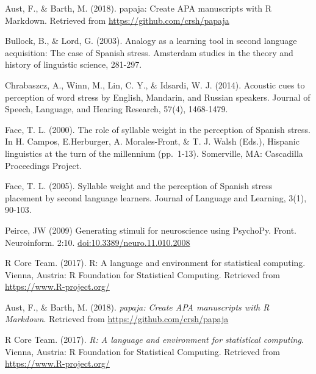 \documentclass[man]{apa6}
\theoremstyle{definition}
\theoremstyle{definition}
\theoremstyle{definition}
\theoremstyle{remark}
\begin{document}
Aust, F., \& Barth, M. (2018). papaja: Create APA manuscripts with R
Markdown. Retrieved from \url{https://github.com/crsh/papaja}

Bullock, B., \& Lord, G. (2003). Analogy as a learning tool in second
language acquisition: The case of Spanish stress. Amsterdam studies in
the theory and history of linguistic science, 281-297.

Chrabaszcz, A., Winn, M., Lin, C. Y., \& Idsardi, W. J. (2014). Acoustic
cues to perception of word stress by English, Mandarin, and Russian
speakers. Journal of Speech, Language, and Hearing Research, 57(4),
1468-1479.

Face, T. L. (2000). The role of syllable weight in the perception of
Spanish stress. In H. Campos, E.Herburger, A. Morales-Front, \& T. J.
Walsh (Eds.), Hispanic linguistics at the turn of the millennium
(pp.~1-13). Somerville, MA: Cascadilla Proceedings Project.

Face, T. L. (2005). Syllable weight and the perception of Spanish stress
placement by second language learners. Journal of Language and Learning,
3(1), 90-103.

Peirce, JW (2009) Generating stimuli for neuroscience using PsychoPy.
Front. Neuroinform. 2:10. \url{doi:10.3389/neuro.11.010.2008}

R Core Team. (2017). R: A language and environment for statistical
computing. Vienna, Austria: R Foundation for Statistical Computing.
Retrieved from \url{https://www.R-project.org/}

\begingroup
\setlength{\parindent}{-0.5in} \setlength{\leftskip}{0.5in}

\hypertarget{refs}{}
\hypertarget{ref-R-papaja}{}
Aust, F., \& Barth, M. (2018). \emph{papaja: Create APA manuscripts with
R Markdown}. Retrieved from \url{https://github.com/crsh/papaja}

\hypertarget{ref-R-base}{}
R Core Team. (2017). \emph{R: A language and environment for statistical
computing}. Vienna, Austria: R Foundation for Statistical Computing.
Retrieved from \url{https://www.R-project.org/}

\endgroup
\end{document}
